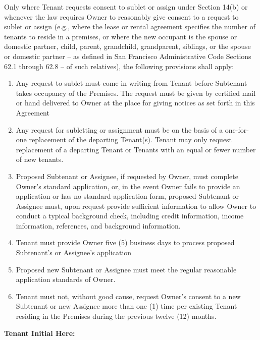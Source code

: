 \documentclass[8pt, letterpaper, oneside]{extarticle}
\begin{document}
\begin{enumerate}
Only where Tenant requests consent to sublet or assign under Section 14(b) or whenever the law requires Owner to reasonably give consent to a request to sublet or assign (e.g., where the lease or rental agreement specifies the number of tenants to reside in a premises, or where the new occupant is the spouse or domestic partner, child, parent, grandchild, grandparent, siblings, or the spouse or domestic partner -- as defined in San Francisco Administrative Code Sections 62.1 through 62.8 -- of such relatives), the following provisions shall apply:
    \begin{enumerate}
     \item Any request to sublet must come in writing from Tenant before Subtenant takes occupancy of the Premises. The request must be given by certified mail or hand delivered to Owner at the place for giving notices as set forth in this Agreement
     \item Any request for subletting or assignment must be on the basis of a one-for-one replacement of the departing Tenant(s). Tenant may only request replacement of a departing Tenant or Tenants with an equal or fewer number of new tenants.
     \item Proposed Subtenant or Assignee, if requested by Owner, must complete Owner's standard application, or, in the event Owner fails to provide an application or has no standard application form, proposed Subtenant or Assignee must, upon request provide sufficient information to allow Owner to conduct a typical background check, including credit information, income information, references, and background information.
     \item Tenant must provide Owner five (5) business days to process proposed Subtenant's or Assignee's application
     \item Proposed new Subtenant or Assignee must meet the regular reasonable application standards of Owner.
     \item Tenant must not, without good cause, request Owner's consent to a new Subtenant or new Assignee more than one (1) time per existing Tenant residing in the Premises during the previous twelve (12) months.
     \end{enumerate}

\vspace{5mm}\textbf{Tenant Initial Here: \underline{\hspace{3cm}}}
   \end{enumerate}
\end{document}
